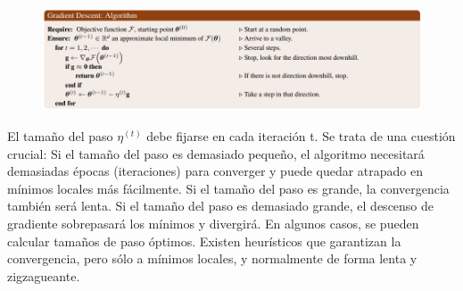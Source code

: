 \begin{figure}[h]
\centering
\includegraphics[width = \textwidth]{figs/gradient-descend-alg.png}
\end{figure}

El tamaño del paso $\eta^{(t)}$ debe fijarse en cada iteración t. Se trata de una cuestión crucial: Si el tamaño del paso es demasiado pequeño, el algoritmo necesitará demasiadas épocas (iteraciones) para converger y puede quedar atrapado en mínimos locales más fácilmente. Si el tamaño del paso es grande, la convergencia también será lenta. Si el tamaño del paso es demasiado grande, el descenso de gradiente sobrepasará los mínimos y divergirá. En algunos casos, se pueden calcular tamaños de paso óptimos.
Existen heurísticos que garantizan la convergencia, pero sólo a mínimos locales, y normalmente de forma lenta y zigzagueante.